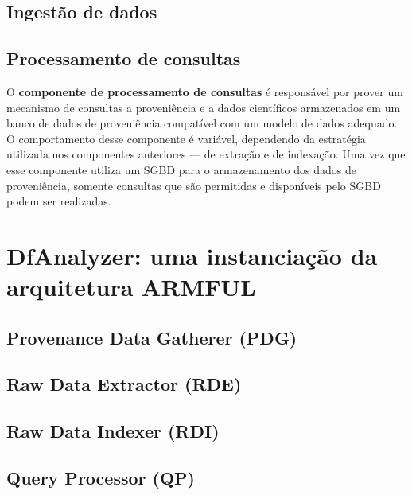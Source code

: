 
\subsection{Ingestão de dados}



\subsection{Processamento de consultas}

O \textbf{componente de processamento de consultas} é responsável por prover um mecanismo de consultas a proveniência e a dados científicos armazenados em um banco de dados de proveniência compatível com um modelo de dados adequado. %
O comportamento desse componente é variável, dependendo da estratégia utilizada nos componentes anteriores --- de extração e de indexação. Uma vez que esse componente utiliza um SGBD para o armazenamento dos dados de proveniência, somente consultas que são permitidas e disponíveis pelo SGBD podem ser realizadas.


\section{DfAnalyzer: uma instanciação da arquitetura ARMFUL}


\subsection{Provenance Data Gatherer (PDG)}

\subsection{Raw Data Extractor (RDE)}

\subsection{Raw Data Indexer (RDI)}


\subsection{Query Processor (QP)}